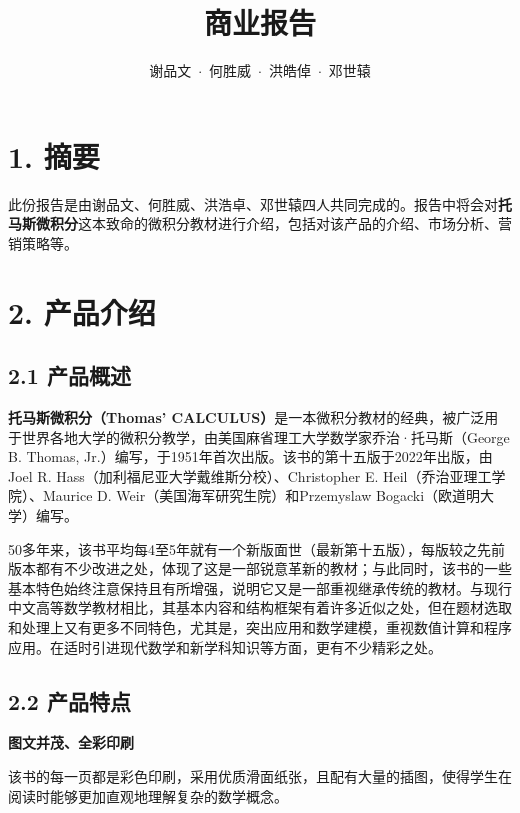 \documentclass{report}
\title{\Huge{\textbf{商业报告}}}
\author{谢品文\ $\cdot$\ 何胜威\ $\cdot$\ 洪皓倬\ $\cdot$\ 邓世辕}
\begin{document}
\maketitle

\tableofcontents

\newpage

\section*{1. 摘要}

此份报告是由谢品文、何胜威、洪浩卓、邓世辕四人共同完成的。报告中将会对\textbf{托马斯微积分}这本致命的微积分教材进行介绍，包括对该产品的介绍、市场分析、营销策略等。

\section*{2. 产品介绍}

\subsection*{2.1 产品概述}

\textbf{托马斯微积分（Thomas' CALCULUS）}是一本微积分教材的经典，被广泛用于世界各地大学的微积分教学，由美国麻省理工大学数学家乔治·托马斯（George B. Thomas, Jr.）编写，于1951年首次出版。该书的第十五版于2022年出版，由Joel R. Hass（加利福尼亚大学戴维斯分校）、Christopher E. Heil（乔治亚理工学院）、Maurice D. Weir（美国海军研究生院）和Przemyslaw Bogacki（欧道明大学）编写。

50多年来，该书平均每4至5年就有一个新版面世（最新第十五版），每版较之先前版本都有不少改进之处，体现了这是一部锐意革新的教材；与此同时，该书的一些基本特色始终注意保持且有所增强，说明它又是一部重视继承传统的教材。与现行中文高等数学教材相比，其基本内容和结构框架有着许多近似之处，但在题材选取和处理上又有更多不同特色，尤其是，突出应用和数学建模，重视数值计算和程序应用。在适时引进现代数学和新学科知识等方面，更有不少精彩之处。

\subsection*{2.2 产品特点}

\noindent\textbf{图文并茂、全彩印刷}

\noindent 该书的每一页都是彩色印刷，采用优质滑面纸张，且配有大量的插图，使得学生在阅读时能够更加直观地理解复杂的数学概念。
~\\
\end{document}
